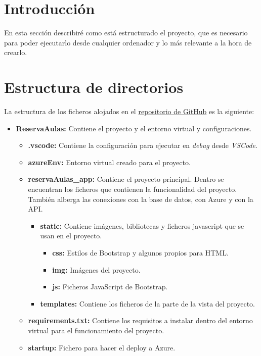 
\section{Introducción}
En esta sección describiré como está estructurado el proyecto, que es necesario para poder ejecutarlo desde cualquier ordenador y lo más relevante a la hora de crearlo.
\section{Estructura de directorios}
La estructura de los ficheros alojados en el \href{https://github.com/jgo0038/TFG-Reserva-aulas-informatica}{repositorio de GitHub} es la siguiente:
\begin{itemize}
    \item \textbf{ReservaAulas:} Contiene el proyecto y el entorno virtual y configuraciones.
    \begin{itemize}
        \item \textbf{.vscode:} Contiene la configuración para ejecutar en \textit{debug} desde \textit{VSCode}.
        \item \textbf{azureEnv:} Entorno virtual creado para el proyecto.
        \item \textbf{reservaAulas\_app:} Contiene el proyecto principal. Dentro se encuentran los ficheros que contienen la funcionalidad del proyecto. También alberga las conexiones con la base de datos, con Azure y con la API.
        \begin{itemize}
            \item \textbf{static:} Contiene imágenes, bibliotecas y ficheros javascript que se usan en el proyecto.
            \begin{itemize}
                \item \textbf{css:} Estilos de Bootstrap y algunos propios para HTML.
                \item \textbf{img:} Imágenes del proyecto.
                \item \textbf{js:} Ficheros JavaScript de Bootstrap.
            \end{itemize}
            \item \textbf{templates:} Contiene los ficheros de la parte de la vista del proyecto.
        \end{itemize}
        \item \textbf{requirements.txt:} Contiene los requisitos a instalar dentro del entorno virtual para el funcionamiento del proyecto.
        \item \textbf{startup:} Fichero para hacer el deploy a Azure.
    \end{itemize}
\end{itemize}
